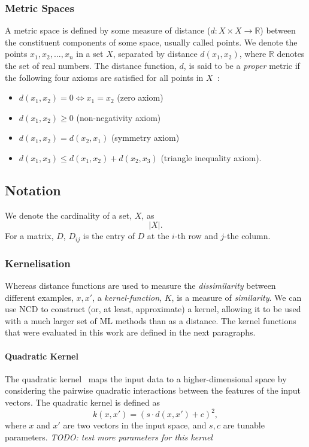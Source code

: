 \documentclass[preprint,12pt]{elsarticle}
\newcommand{\cm}[1]{\textit{{\color{blue}#1}}}
\begin{document}
\subsubsection{Metric Spaces}
\label{metric_spaces}
A metric space is defined by some measure of distance ($d:X \times X \rightarrow \mathbb{R}$) between the constituent components of some space, usually called points.
We denote the points $x_1,x_2,\ldots,x_n$  in a set $X$, separated by distance $d(x_1,x_2)$, where  $\mathbb{R}$ denotes the set of real numbers.
The distance function, $d$, is said to be a \textit{proper} metric if the following four axioms are satisfied for all points in $X$~\cite{metrics}:

\begin{itemize}
    \item $d(x_1,x_2) = 0 \iff x_1 = x_2$ (zero axiom)
    \item $d(x_1,x_2) \geq 0$ (non-negativity axiom)
    \item $d(x_1,x_2) = d(x_2, x_1)$ (symmetry axiom)
    \item $d(x_1, x_3) \leq d(x_1,x_2) + d(x_2,x_3)$ (triangle inequality axiom).
\end{itemize}

\subsection{Notation}
We denote the cardinality of a set, $X$, as
$$
    | X |.
$$
For a matrix, $D$, $D_{ij}$ is the entry of $D$ at the $i$-th row and $j$-the column.

\subsubsection{Kernelisation}
\label{kernels}

Whereas distance functions are used to measure the \textit{dissimilarity} between different examples, $x,x'$, a \textit{kernel-function}, $K$, is a measure of \textit{similarity}.
We can use NCD to construct (or, at least, approximate) a kernel, allowing it to be used with a much larger set of ML methods than as a distance.
The kernel functions that were evaluated in this work are defined in the next paragraphs.



\paragraph{Quadratic Kernel}
\label{quadratic_kernel}
The quadratic kernel~\cite{kernels} maps the input data to a higher-dimensional space by considering the pairwise quadratic interactions between the features of the input vectors.
The quadratic kernel is defined as
$$
    k(x, x') = (s \cdot d(x,x') + c)^2,
$$
where $x$ and $x'$ are two vectors in the input space, and $s, c$ are tunable parameters.
\cm{TODO: test more parameters for this kernel}
\end{document}
